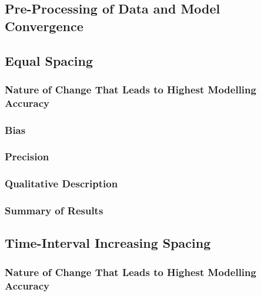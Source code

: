 \documentclass[
12pt, %
twoside,
english]{guelphthesis}
\begin{document}
\hypertarget{pre-processing-of-data-and-model-convergence}{%
\subsection{Pre-Processing of Data and Model Convergence}\label{pre-processing-of-data-and-model-convergence}}

\hypertarget{concise-tab}{%
\subsection{Equal Spacing}\label{concise-tab}}

\hypertarget{nature-change-equal-exp1}{%
\subsubsection{Nature of Change That Leads to Highest Modelling Accuracy}\label{nature-change-equal-exp1}}

\hypertarget{bias-equal-exp1}{%
\subsubsection{Bias}\label{bias-equal-exp1}}

\hypertarget{precision-equal-exp1}{%
\subsubsection{Precision}\label{precision-equal-exp1}}

\hypertarget{qualitative-equal-exp1}{%
\subsubsection{Qualitative Description}\label{qualitative-equal-exp1}}

\hypertarget{summary-of-results}{%
\subsubsection{Summary of Results}\label{summary-of-results}}

\hypertarget{time-interval-increasing-spacing}{%
\subsection{Time-Interval Increasing Spacing}\label{time-interval-increasing-spacing}}

\hypertarget{nature-change-time-inc-exp1}{%
\subsubsection{Nature of Change That Leads to Highest Modelling Accuracy}\label{nature-change-time-inc-exp1}}
\end{document}
